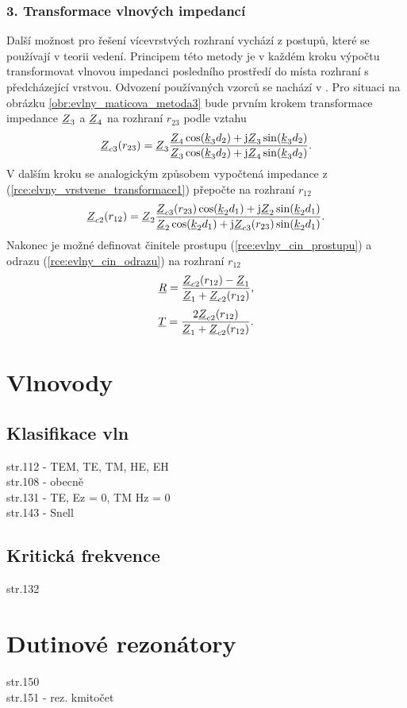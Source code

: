 \subsubsection*{3. Transformace vlnových impedancí}
Další možnost pro řešení vícevrstvých rozhraní vychází z postupů, které se používají v teorii vedení. Principem této metody je v každém kroku výpočtu transformovat vlnovou impedanci posledního prostředí do místa rozhraní s předcházející vrstvou. 
Odvození používaných vzorců se nachází v \cite[str. 106]{emp}.
Pro situaci na obrázku \ref{obr:evlny_maticova_metoda3} bude prvním krokem transformace impedance ${\underline{Z}}_{3}$ a ${\underline{Z}}_{4}$ na rozhraní $r_{23}$ podle vztahu
\begin{equation}
	{\underline{Z}}_{c3}(r_{23}) = {\underline{Z}}_{3}\frac{{\underline{Z}}_{4}\cos({\underline{k}}_{3}d_{2})+\mathrm{j}{\underline{Z}}_{3}\sin({\underline{k}}_{3}d_{2})}{{\underline{Z}}_{3}\cos({\underline{k}}_{3}d_{2})+\mathrm{j}{\underline{Z}}_{4}\sin({\underline{k}}_{3}d_{2})}.
	\label{rce:elvny_vrstvene_transformace1}
\end{equation}
V dalším kroku se analogickým způsobem vypočtená impedance z (\ref{rce:elvny_vrstvene_transformace1}) přepočte na rozhraní $r_{12}$
\begin{equation}
	{\underline{Z}}_{c2}(r_{12}) = {\underline{Z}}_{2}\frac{{\underline{Z}}_{c3}(r_{23})\cos({\underline{k}}_{2}d_{1})+\mathrm{j}{\underline{Z}}_{2}\sin({\underline{k}}_{2}d_{1})}{{\underline{Z}}_{2}\cos({\underline{k}}_{2}d_{1})+\mathrm{j}{\underline{Z}}_{c3}(r_{23})\sin({\underline{k}}_{2}d_{1})}.
	\label{rce:elvny_vrstvene_transformace2}
\end{equation}
Nakonec je možné definovat činitele prostupu (\ref{rce:evlny_cin_prostupu}) a odrazu (\ref{rce:evlny_cin_odrazu}) na rozhraní $r_{12}$
\begin{equation}
	{\underline{R}} = \frac{{\underline{Z}}_{c2}(r_{12}) - {\underline{Z}}_{1}}{{\underline{Z}}_{1} + {\underline{Z}}_{c2}(r_{12})}
	\label{rce:elvny_vrstvene_transf_R},
\end{equation}
\begin{equation}
	{\underline{T}} = \frac{2{\underline{Z}}_{c2}(r_{12})}{{\underline{Z}}_{1} + {\underline{Z}}_{c2}(r_{12})}
	\label{rce:elvny_vrstvene_transf_T}.
\end{equation}


\newpage

\section{Vlnovody}
\subsection{Klasifikace vln}
str.112 - TEM, TE, TM, HE, EH\\
str.108 - obecně\\
str.131 - TE, Ez = 0, TM Hz = 0\\
str.143 - Snell\\
\subsection{Kritická frekvence}
str.132
\newpage

\section{Dutinové rezonátory}
str.150\\
str.151 - rez. kmitočet\\
\newpage